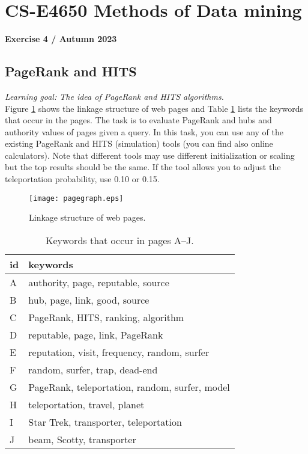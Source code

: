 \documentclass[a4paper,12pt]{article}
\begin{document}
\section*{CS-E4650 Methods of Data mining}
\textbf{\large Exercise 4 / Autumn 2023}

\setcounter{section}{4}


\subsection{PageRank and HITS}

{\em Learning goal: The idea of PageRank and HITS algorithms.}\\

Figure \ref{webgraph} shows the linkage structure of web pages and
Table \ref{webcont} lists the keywords that occur in the pages. The
task is to evaluate PageRank and hubs and authority values of pages
given a query. In this task, you can use any of the existing PageRank and
HITS (simulation) tools (you can find also online calculators). Note
that different tools may use different initialization or scaling but
the top results should be the same. If the tool allows you to adjust
the teleportation probability, use 0.10 or 0.15.

\begin{figure}[!h]
\begin{center}
\texttt{[image: pagegraph.eps]}
\end{center}
\caption{Linkage structure of web pages.}
\label{webgraph}
\end{figure}

\begin{table}[!h]
\caption{Keywords that occur in pages A--J.}
\label{webcont}
\begin{center}
\begin{tabular}{|l|l|}
\hline
id&keywords\\
\hline
A&authority, page, reputable, source\\
B&hub, page, link, good, source\\
C&PageRank, HITS, ranking, algorithm\\
D&reputable, page, link, PageRank\\
E&reputation, visit, frequency, random, surfer\\
F&random, surfer, trap, dead-end\\
G&PageRank, teleportation, random, surfer, model\\
H&teleportation, travel, planet\\
I&Star Trek, transporter, teleportation\\
J&beam, Scotty, transporter\\
\hline
\end{tabular}
\end{center}
\end{table}
\end{document}
